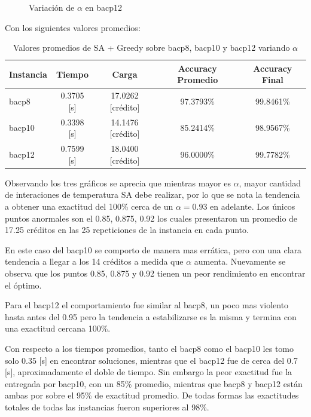 \documentclass[letterpaper,10pt]{article}
\begin{document}
\begin{figure}[H]
        \caption{Variación de $\alpha$ en bacp12}
        \label{fig:alpha3}
    \endminipage
\end{figure}

Con los siguientes valores promedios:

\begin{table}[H]
  \centering
  \begin{tabular}{@{}lcccc@{}}
    \toprule[1pt]
    Instancia & Tiempo & Carga & Accuracy Promedio & Accuracy Final \\
    \midrule
     bacp8 & 0.3705 [s] & 17.0262 [crédito] & 97.3793\% & 99.8461\% \\
    bacp10 & 0.3398 [s] & 14.1476 [crédito] & 85.2414\% & 98.9567\% \\
    bacp12 & 0.7599 [s] & 18.0400 [crédito] & 96.0000\% & 99.7782\% \\
    \bottomrule
  \end{tabular}
  \caption{Valores promedios de SA + Greedy sobre bacp8, bacp10 y bacp12 variando $\alpha$}
\end{table}

Observando los tres gráficos se aprecia que mientras mayor es $\alpha$, mayor cantidad de interaciones de temperatura SA debe realizar, por lo que se nota la tendencia a obtener una exactitud del 100\% cerca de un $\alpha = 0.93$ en adelante. Los únicos puntos anormales son el 0.85, 0.875, 0.92 los cuales presentaron un promedio de 17.25 créditos en las 25 repeticiones de la instancia en cada punto.

En este caso del bacp10 se comporto de manera mas errática, pero con una clara tendencia a llegar a los 14 créditos a medida que $\alpha$ aumenta. Nuevamente se observa que los puntos 0.85, 0.875 y 0.92 tienen un peor rendimiento en encontrar el óptimo.

Para el bacp12 el comportamiento fue similar al bacp8, un poco mas violento hasta antes del 0.95 pero la tendencia a estabilizarse es la misma y termina con una exactitud cercana 100\%.

Con respecto a los tiempos promedios, tanto el bacp8 como el bacp10 les tomo solo 0.35 [s] en encontrar soluciones, mientras que el bacp12 fue de cerca del 0.7 [s], aproximadamente el doble de tiempo. Sin embargo la peor exactitud fue la entregada por bacp10, con un 85\% promedio, mientras que bacp8 y bacp12 están ambas por sobre el 95\% de exactitud promedio. De todas formas las exactitudes totales de todas las instancias fueron superiores al 98\%.
\end{document}
